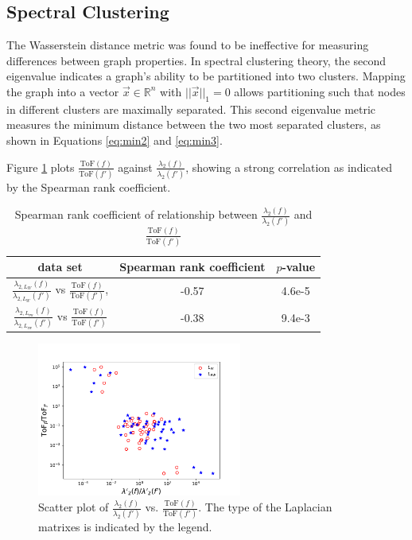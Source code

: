 \documentclass[letterpaper,12pt]{article}
\begin{document}
\subsection{Spectral Clustering}
The Wasserstein distance metric was found to be ineffective for measuring differences between graph properties. In spectral clustering theory, the second eigenvalue indicates a graph's ability to be partitioned into two clusters. Mapping the graph into a vector $\vec{x} \in \mathbb{R}^n$ with $||\vec{x}||_1=0$ allows partitioning such that nodes in different clusters are maximally separated. This second eigenvalue metric measures the minimum distance between the two most separated clusters, as shown in Equations \ref{eq:min2} and \ref{eq:min3}.

Figure \ref{fig:d_eig_tof} plots $\frac{\text{ToF}(f)}{\text{ToF}(f')}$ against $\frac{\lambda_2(f)}{\lambda_2(f')}$, showing a strong correlation as indicated by the Spearman rank coefficient.
\begin{table}[h]
    \centering
    \begin{tabular}{c c c  }
    \hline
        data set & Spearman rank coefficient & $p$-value   \\ 
        \hline
        $\frac{\lambda_{2,L_W}(f)}{\lambda_{2,L_W}(f')}$ vs $\frac{\text{ToF}(f)}{\text{ToF}(f')}$,  & -0.57 & 4.6e-5 \\
        $\frac{\lambda_{2,L_\text{rw}}(f)}{\lambda_{2,L_\text{rw}}(f')}$ vs $\frac{\text{ToF}(f)}{\text{ToF}(f')}$ & -0.38 & 9.4e-3  \\ 
    \hline
    \end{tabular}
    \caption{ Spearman rank coefficient of relationship between $\frac{\lambda_2(f)}{\lambda_2(f')}$ and  $\frac{\text{ToF}(f)}{\text{ToF}(f')}$}
    \label{tab:spearman}
\end{table}



\begin{figure}
    \centering
    \includegraphics[width=0.6\textwidth]{figs/ratio_tof_2ndEigval.pdf}
    \caption{Scatter plot of $\frac{\lambda_{2}(f)}{\lambda_{2}(f')}$ vs. $\frac{\text{ToF}(f)}{\text{ToF}(f')}$. The type of the Laplacian matrixes is indicated by the legend.}
    \label{fig:d_eig_tof}
\end{figure}
\end{document}
